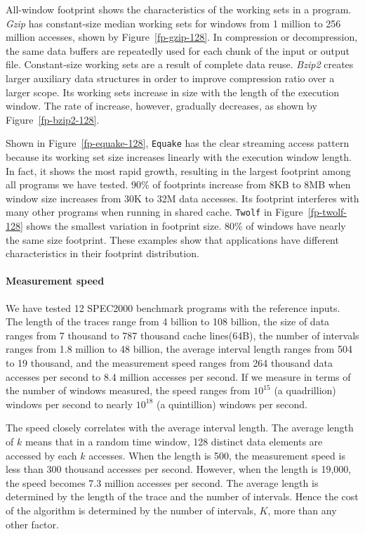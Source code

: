 All-window footprint shows the characteristics of the working sets in
a program.  \emph{Gzip} has constant-size median working sets for
windows from 1 million to 256 million accesses, shown by
Figure~\ref{fp-gzip-128}.  In compression or decompression, the same
data buffers are repeatedly used for each chunk of the input or output
file.  Constant-size working sets are a result of complete data reuse.
\emph{Bzip2} creates larger auxiliary data structures in order to
improve compression ratio over a larger scope.  Its working sets
increase in size with the length of the execution window.  The rate of
increase, however, gradually decreases, as shown by
Figure~\ref{fp-bzip2-128}.

Shown in Figure~\ref{fp-equake-128}, {\tt Equake} has the clear
streaming access pattern because its working set size increases
linearly with the execution window length.  In fact, it shows the most
rapid growth, resulting in the largest footprint among all programs we
have tested.  90\% of footprints increase from 8KB to 8MB when window
size increases from 30K to 32M data accesses.  Its footprint
interferes with many other programs when running in shared cache.
{\tt Twolf} in Figure~\ref{fp-twolf-128} shows the smallest variation
in footprint size.  80\% of windows have nearly the
same size footprint.  These examples show that 
applications have different characteristics in their footprint distribution.

\paragraph{Measurement speed}
We have tested 12 SPEC2000 benchmark programs with the reference inputs. 
The length of the traces range from 4 billion to 108 billion, the size
of data ranges from 7 thousand to 787 thousand cache lines(64B), the number of
intervals ranges from 1.8 million to 48 billion, the average interval
length ranges from 504 to 19 thousand, and the measurement speed
ranges from 264 thousand data accesses per second to 8.4 million
accesses per second.  If we measure in terms of the number of windows
measured, the speed ranges from $10^{15}$ (a quadrillion) windows per
second to nearly $10^{18}$ (a quintillion) windows per second.

The speed closely correlates with the average interval length.  The
average length of $k$ means that in a random time window, 128 distinct
data elements are accessed by each $k$ accesses.  When the length is
500, the measurement speed is less than 300 thousand accesses per
second.  However, when the length is 19,000, the speed becomes 7.3
million accesses per second.  The average length is determined by the
length of the trace and the number of intervals.  Hence the cost of
the algorithm is determined by the number of intervals, $K$, more than
any other factor.

